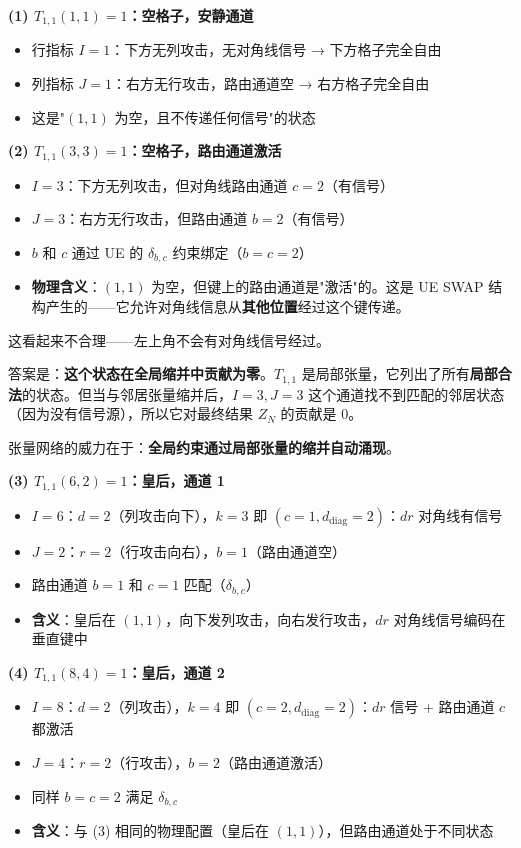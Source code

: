 \documentclass[12pt,a4paper]{article}
\begin{document}
\begin{keybox}[逐个解读]

\textbf{(1) $T_{1,1}(1, 1) = 1$：空格子，安静通道}
\begin{itemize}
  \item 行指标 $I{=}1$：下方无列攻击，无对角线信号 → 下方格子完全自由
  \item 列指标 $J{=}1$：右方无行攻击，路由通道空 → 右方格子完全自由
  \item 这是"$(1,1)$ 为空，且不传递任何信号"的状态
\end{itemize}

\textbf{(2) $T_{1,1}(3, 3) = 1$：空格子，路由通道激活}
\begin{itemize}
  \item $I{=}3$：下方无列攻击，但对角线路由通道 $c{=}2$（有信号）
  \item $J{=}3$：右方无行攻击，但路由通道 $b{=}2$（有信号）
  \item $b$ 和 $c$ 通过 UE 的 $\delta_{b,c}$ 约束绑定（$b{=}c{=}2$）
  \item \textbf{物理含义}：$(1,1)$ 为空，但键上的路由通道是"激活"的。这是 UE SWAP 结构产生的——它允许对角线信息从\textbf{其他位置}经过这个键传递。
\end{itemize}

\begin{warnbox}
这看起来不合理——左上角不会有对角线信号经过。

答案是：\textbf{这个状态在全局缩并中贡献为零}。$T_{1,1}$ 是局部张量，它列出了所有\textbf{局部合法}的状态。但当与邻居张量缩并后，$I{=}3, J{=}3$ 这个通道找不到匹配的邻居状态（因为没有信号源），所以它对最终结果 $Z_N$ 的贡献是 0。

张量网络的威力在于：\textbf{全局约束通过局部张量的缩并自动涌现}。
\end{warnbox}

\textbf{(3) $T_{1,1}(6, 2) = 1$：皇后，通道 1}
\begin{itemize}
  \item $I{=}6$：$d{=}2$（列攻击向下），$k{=}3$ 即 $(c{=}1, d_{\text{diag}}{=}2)$：$dr$ 对角线有信号
  \item $J{=}2$：$r{=}2$（行攻击向右），$b{=}1$（路由通道空）
  \item 路由通道 $b{=}1$ 和 $c{=}1$ 匹配（$\delta_{b,c}$）
  \item \textbf{含义}：皇后在 $(1,1)$，向下发列攻击，向右发行攻击，$dr$ 对角线信号编码在垂直键中
\end{itemize}

\textbf{(4) $T_{1,1}(8, 4) = 1$：皇后，通道 2}
\begin{itemize}
  \item $I{=}8$：$d{=}2$（列攻击），$k{=}4$ 即 $(c{=}2, d_{\text{diag}}{=}2)$：$dr$ 信号 + 路由通道 $c$ 都激活
  \item $J{=}4$：$r{=}2$（行攻击），$b{=}2$（路由通道激活）
  \item 同样 $b{=}c{=}2$ 满足 $\delta_{b,c}$
  \item \textbf{含义}：与 (3) 相同的物理配置（皇后在 $(1,1)$），但路由通道处于不同状态
\end{itemize}
\end{keybox}
\end{document}

